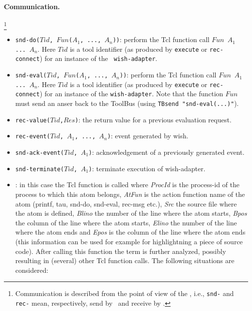 \paragraph{Communication.} \hspace{-0.3cm}\footnote{Communication is described
from the point of view of the \TB, i.e., {\tt snd-} and {\tt rec-}
mean, respectively, send by \TB\ and receive by \TB.}

\begin{itemize}
\item {\tt snd-do($Tid$, $Fun$($A_1$, ..., $A_n$))}: perform the Tcl function
call
{\tt $Fun$ $A_1$  ... $A_n$}. Here $Tid$ is a tool identifier
(as produced by {\tt execute} or {\tt rec-connect}) for an instance of the {\tt
wish-adapter}.
\item {\tt snd-eval($Tid$, $Fun$($A_1$, ..., $A_n$))}: perform the Tcl function call
{\tt $Fun$ $A_1$  ... $A_n$}. Here $Tid$ is a tool identifier 
(as produced by {\tt execute} or {\tt rec-connect}) for an instance of the {\tt wish-adapter}.
Note that the function {\tt $Fun$} must send an anser back to the
ToolBus (using {\tt TBsend "snd-eval(...)"}).
\item {\tt rec-value($Tid$,$Res$)}: the return value for a previous evaluation request.
\item {\tt rec-event($Tid$, $A_1$, ..., $A_n$)}: event generated by wish.
\item {\tt snd-ack-event($Tid$, $A_1$)}: acknowledgement of
a previously generated event.
\item {\tt snd-terminate($Tid$, $A_1$)}: terminate execution of wish-adapter.
\item {}: in this case the Tcl
  function 
  is called where \emph{ProcId} is the process-id of the process to
  which this atom belongs, \emph{AtFun} is the action function name of
  the atom (printf, tau, snd-do, snd-eval, rec-msg etc.), \emph{Src} the
  source file where the atom is defined, \emph{Blino} the number of
  the line where the atom starts, \emph{Bpos} the column of the
  line where the atom starts, \emph{Elino} the number of the line
  where the atom ends and \emph{Epos} is the column of the line where
  the atom ends (this information can be used for example for
  highlightning a piece of source code). 
  After calling this function the term is further analyzed,
  possibly resulting in (several) other Tcl function
  calls. The following situations are considered:

\end{itemize}
